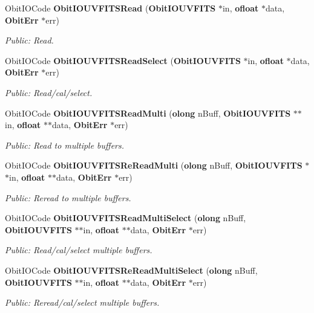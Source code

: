 \begin{CompactItemize}
Obit\-IOCode {\bf Obit\-IOUVFITSRead} ({\bf Obit\-IOUVFITS} $\ast$in, {\bf ofloat} $\ast$data, {\bf Obit\-Err} $\ast$err)
\begin{CompactList}\small\item\em Public: Read. \item\end{CompactList}\item 
Obit\-IOCode {\bf Obit\-IOUVFITSRead\-Select} ({\bf Obit\-IOUVFITS} $\ast$in, {\bf ofloat} $\ast$data, {\bf Obit\-Err} $\ast$err)
\begin{CompactList}\small\item\em Public: Read/cal/select. \item\end{CompactList}\item 
Obit\-IOCode {\bf Obit\-IOUVFITSRead\-Multi} ({\bf olong} n\-Buff, {\bf Obit\-IOUVFITS} $\ast$$\ast$in, {\bf ofloat} $\ast$$\ast$data, {\bf Obit\-Err} $\ast$err)
\begin{CompactList}\small\item\em Public: Read to multiple buffers. \item\end{CompactList}\item 
Obit\-IOCode {\bf Obit\-IOUVFITSRe\-Read\-Multi} ({\bf olong} n\-Buff, {\bf Obit\-IOUVFITS} $\ast$$\ast$in, {\bf ofloat} $\ast$$\ast$data, {\bf Obit\-Err} $\ast$err)
\begin{CompactList}\small\item\em Public: Reread to multiple buffers. \item\end{CompactList}\item 
Obit\-IOCode {\bf Obit\-IOUVFITSRead\-Multi\-Select} ({\bf olong} n\-Buff, {\bf Obit\-IOUVFITS} $\ast$$\ast$in, {\bf ofloat} $\ast$$\ast$data, {\bf Obit\-Err} $\ast$err)
\begin{CompactList}\small\item\em Public: Read/cal/select multiple buffers. \item\end{CompactList}\item 
Obit\-IOCode {\bf Obit\-IOUVFITSRe\-Read\-Multi\-Select} ({\bf olong} n\-Buff, {\bf Obit\-IOUVFITS} $\ast$$\ast$in, {\bf ofloat} $\ast$$\ast$data, {\bf Obit\-Err} $\ast$err)
\begin{CompactList}\small\item\em Public: Reread/cal/select multiple buffers. \item\end{CompactList}\item 

\end{CompactItemize}
